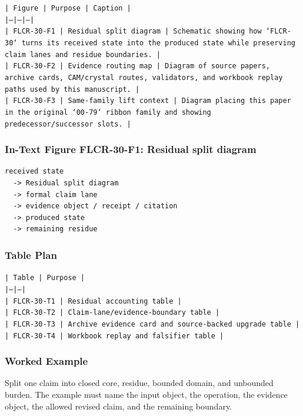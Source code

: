 \documentclass[11pt]{article}
\begin{document}
\noindent\texttt{| Figure | Purpose | Caption |}\\
\noindent\texttt{|---|---|---|}\\
\noindent\texttt{| FLCR-30-F1 | Residual split diagram | Schematic showing how `FLCR-30` turns its received state into the produced state while preserving claim lanes and residue boundaries. |}\\
\noindent\texttt{| FLCR-30-F2 | Evidence routing map | Diagram of source papers, archive cards, CAM/crystal routes, validators, and workbook replay paths used by this manuscript. |}\\
\noindent\texttt{| FLCR-30-F3 | Same-family lift context | Diagram placing this paper in the original `00-79` ribbon family and showing predecessor/successor slots. |}\\

\subsubsection*{In-Text Figure FLCR-30-F1: Residual split diagram}

\begin{verbatim}
received state
  -> Residual split diagram
  -> formal claim lane
  -> evidence object / receipt / citation
  -> produced state
  -> remaining residue
\end{verbatim}

\subsubsection*{Table Plan}

\noindent\texttt{| Table | Purpose |}\\
\noindent\texttt{|---|---|}\\
\noindent\texttt{| FLCR-30-T1 | Residual accounting table |}\\
\noindent\texttt{| FLCR-30-T2 | Claim-lane/evidence-boundary table |}\\
\noindent\texttt{| FLCR-30-T3 | Archive evidence card and source-backed upgrade table |}\\
\noindent\texttt{| FLCR-30-T4 | Workbook replay and falsifier table |}\\

\subsubsection*{Worked Example}

Split one claim into closed core, residue, bounded domain, and unbounded burden. The example must name the input object, the operation,
the evidence object, the allowed revised claim, and the remaining boundary.
\end{document}
